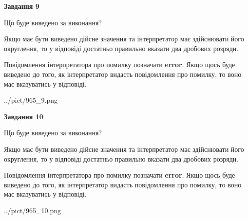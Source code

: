 \documentclass[12pt, ukrainian]{article}
\begin{document}
{\begin {Large}
{\begin {center}\textbf{Завдання 9}\end {center}}\par
Що буде виведено за виконання? \par

Якщо має бути виведено дійсне значення та інтерпретатор має здійснювати його округлення, 
то у відповіді достатньо правильно вказати два дробових розряди.

Повідомлення інтерпретатора про помилку позначати \textbf{error}.
Якщо щось буде виведено до того, як інтерпретатор видасть повідомлення про помилку, 
то воно має вказуватись у відповіді. \par

\begin{center}
	{../pict/965_9.png}
\end{center}
\newpage

{\begin {center}\textbf{Завдання 10}\end {center}}\par
Що буде виведено за виконання? \par

Якщо має бути виведено дійсне значення та інтерпретатор має здійснювати його округлення, 
то у відповіді достатньо правильно вказати два дробових розряди.

Повідомлення інтерпретатора про помилку позначати \textbf{error}.
Якщо щось буде виведено до того, як інтерпретатор видасть повідомлення про помилку, 
то воно має вказуватись у відповіді. \par

\begin{center}
	{../pict/965_10.png}
\end{center}
\newpage

\end {Large}}
\end{document}
